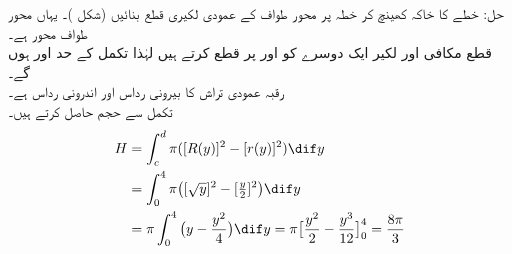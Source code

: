 حل:\quad
{}\quad
خطے کا خاکہ کھینچ کر خطہ پر محور طواف کے عمودی لکیری قطع بنائیں (شکل )۔ یہاں محور طواف  محور ہے۔\\
\quad
قطع مکافی اور لکیر ایک دوسرے کو  اور  پر قطع کرتے ہیں لہٰذا تکمل کے حد  اور  ہوں گے۔\\
\quad
رقبہ عمودی تراش کا بیرونی رداس  اور اندرونی رداس  ہے۔\\
\quad
تکمل سے حجم حاصل کرتے ہیں۔
\begin{align*}
H&=\int_c^d\pi([R(y)]^2-[r(y)]^2)\dif y\\
&=\int_0^4\pi\big([\sqrt{y}]^2-[\tfrac{y}{2}]^2\big)\dif y\\
&=\pi\int_0^4\big(y-\frac{y^2}{4}\big)\dif y=\pi\big[\frac{y^2}{2}-\frac{y^3}{12}\big]_0^4=\frac{8\pi}{3}
\end{align*} 
